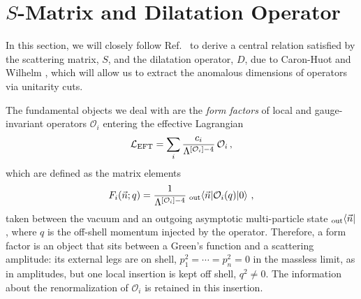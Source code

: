\section{\texorpdfstring{$S$-Matrix and Dilatation Operator}{S-Matrix and Dilatation Operator}}
\label{sec:RGEsmatrix}

In this section, we will closely follow Ref.~\cite{EliasMiro:2020tdv} to derive a central relation satisfied by the scattering matrix, $S$, and the dilatation operator, $D$, due to Caron-Huot and Wilhelm \cite{Caron-Huot:2016cwu}, which will allow us to extract the anomalous dimensions of operators via unitarity cuts.

The fundamental objects we deal with are the \textit{form factors} of local and gauge-invariant operators $\mathcal{O}_i$ entering the effective Lagrangian
\begin{equation}\label{eq:RGELagrangian}
    \mathcal L_{\rm EFT} = \sum_i \frac{c_i}{\Lambda^{[\mathcal O_i]-4}}\,\mathcal O_i\,,
\end{equation}
which are defined as the matrix elements
\begin{equation}\label{eq:RGEformfactor}
    F_i(\vec n;q) = \frac{1}{\Lambda^{[\mathcal O_i]-4}}\; {}_{\text{out}}\!\mel{\vec n}{\mathcal O_i(q)}{0}\,,
\end{equation}
taken between the vacuum and an outgoing asymptotic multi-particle state ${}_{\text{out}}\!\bra{\vec n}$,
where $q$ is the off-shell momentum injected by the operator.
Therefore, a form factor is an object that sits between a Green's function and a scattering amplitude: its external legs are on shell, $p_1^2 = \dotsb = p_n^2 = 0$ in the massless limit, as in amplitudes, but one local insertion is kept off shell, $q^2 \neq 0$. The information about the renormalization of $\mathcal O_i$ is retained in this insertion.

